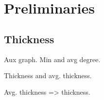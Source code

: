 \section{Preliminaries}

\subsection{Thickness}

\begin{definition}
    Aux graph. Min and avg degree.
\end{definition}


\begin{definition}
    Thickness and avg. thickness.
\end{definition}


\begin{lemma}
    Avg. thickness => thickness.
\end{lemma}
